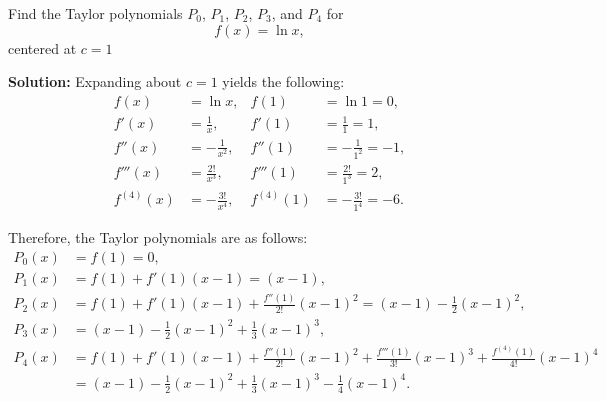 \documentclass[12pt]{article}
\theoremstyle{beautifulthm}
\begin{document}
\begin{tcolorbox}[colback=examplebg, colframe=red!75!black, title=\textbf{EXAMPLE 3: Finding Taylor Polynomials for $\ln x$}, fonttitle=\bfseries, sharp corners]
Find the Taylor polynomials $P_0$, $P_1$, $P_2$, $P_3$, and $P_4$ for 
\[
f(x) = \ln x,
\]
centered at $c = 1$


\tcblower
\textbf{Solution:} 
Expanding about $c = 1$ yields the following:
\[
\begin{aligned}
f(x) &= \ln x, & f(1) &= \ln 1 = 0, \\
f'(x) &= \frac{1}{x}, & f'(1) &= \frac{1}{1} = 1, \\
f''(x) &= -\frac{1}{x^2}, & f''(1) &= -\frac{1}{1^2} = -1, \\
f'''(x) &= \frac{2!}{x^3}, & f'''(1) &= \frac{2!}{1^3} = 2, \\
f^{(4)}(x) &= -\frac{3!}{x^4}, & f^{(4)}(1) &= -\frac{3!}{1^4} = -6.
\end{aligned}
\]

Therefore, the Taylor polynomials are as follows:
\[
\begin{aligned}
P_0(x) &= f(1) = 0, \\
P_1(x) &= f(1) + f'(1)(x-1) = (x-1), \\
P_2(x) &= f(1) + f'(1)(x-1) + \frac{f''(1)}{2!}(x-1)^2 = (x-1) - \frac{1}{2}(x-1)^2, \\
P_3(x) &=  (x-1) - \frac{1}{2}(x-1)^2 + \frac{1}{3}(x-1)^3, \\
P_4(x) &= f(1) + f'(1)(x-1) + \frac{f''(1)}{2!}(x-1)^2 + \frac{f'''(1)}{3!}(x-1)^3 + \frac{f^{(4)}(1)}{4!}(x-1)^4 \\
&= (x-1) - \frac{1}{2}(x-1)^2 + \frac{1}{3}(x-1)^3 - \frac{1}{4}(x-1)^4.
\end{aligned}
\]
\end{tcolorbox}
\end{document}
